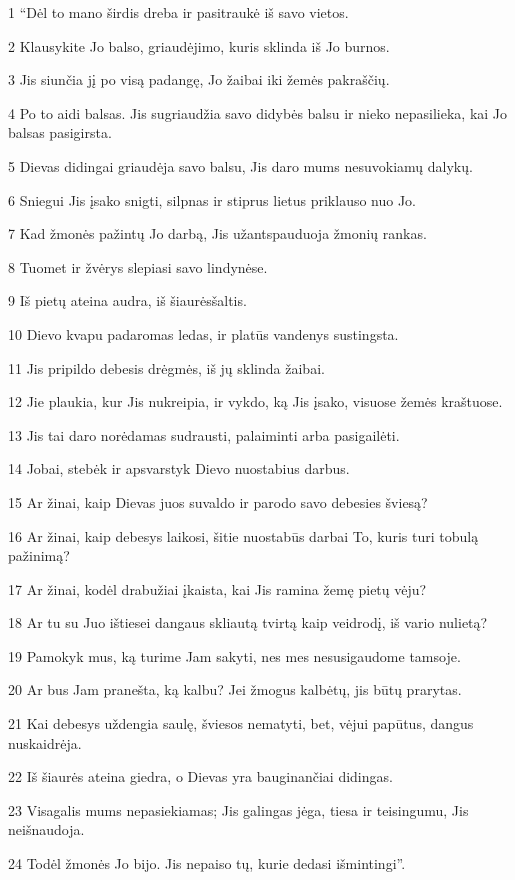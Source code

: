 \par 1 “Dėl to mano širdis dreba ir pasitraukė iš savo vietos. 
\par 2 Klausykite Jo balso, griaudėjimo, kuris sklinda iš Jo burnos. 
\par 3 Jis siunčia jį po visą padangę, Jo žaibai iki žemės pakraščių. 
\par 4 Po to aidi balsas. Jis sugriaudžia savo didybės balsu ir nieko nepasilieka, kai Jo balsas pasigirsta. 
\par 5 Dievas didingai griaudėja savo balsu, Jis daro mums nesuvokiamų dalykų. 
\par 6 Sniegui Jis įsako snigti, silpnas ir stiprus lietus priklauso nuo Jo. 
\par 7 Kad žmonės pažintų Jo darbą, Jis užantspauduoja žmonių rankas. 
\par 8 Tuomet ir žvėrys slepiasi savo lindynėse. 
\par 9 Iš pietų ateina audra, iš šiaurės­šaltis. 
\par 10 Dievo kvapu padaromas ledas, ir platūs vandenys sustingsta. 
\par 11 Jis pripildo debesis drėgmės, iš jų sklinda žaibai. 
\par 12 Jie plaukia, kur Jis nukreipia, ir vykdo, ką Jis įsako, visuose žemės kraštuose. 
\par 13 Jis tai daro norėdamas sudrausti, palaiminti arba pasigailėti. 
\par 14 Jobai, stebėk ir apsvarstyk Dievo nuostabius darbus. 
\par 15 Ar žinai, kaip Dievas juos suvaldo ir parodo savo debesies šviesą? 
\par 16 Ar žinai, kaip debesys laikosi, šitie nuostabūs darbai To, kuris turi tobulą pažinimą? 
\par 17 Ar žinai, kodėl drabužiai įkaista, kai Jis ramina žemę pietų vėju? 
\par 18 Ar tu su Juo ištiesei dangaus skliautą tvirtą kaip veidrodį, iš vario nulietą? 
\par 19 Pamokyk mus, ką turime Jam sakyti, nes mes nesusigaudome tamsoje. 
\par 20 Ar bus Jam pranešta, ką kalbu? Jei žmogus kalbėtų, jis būtų prarytas. 
\par 21 Kai debesys uždengia saulę, šviesos nematyti, bet, vėjui papūtus, dangus nuskaidrėja. 
\par 22 Iš šiaurės ateina giedra, o Dievas yra bauginančiai didingas. 
\par 23 Visagalis mums nepasiekiamas; Jis galingas jėga, tiesa ir teisingumu, Jis neišnaudoja. 
\par 24 Todėl žmonės Jo bijo. Jis nepaiso tų, kurie dedasi išmintingi”.




